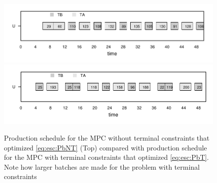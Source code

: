 \documentclass{elsarticle}
\theoremstyle{definition}
\begin{document}
\begin{figure}
\begin{center}
\includegraphics{NTS_gantt.pdf}
\includegraphics{TS_gantt.pdf}
\caption{Production schedule for the MPC without terminal constraints that optimized
  \eqref{eq:esc:PbNT} (Top) compared with production schedule for the MPC
  with terminal constraints that optimized \eqref{eq:esc:PbT}. Note how larger batches are made for
  the problem with terminal constraints}
\end{center}
\label{fig:abcdefg}
\end{figure}
\end{document}
